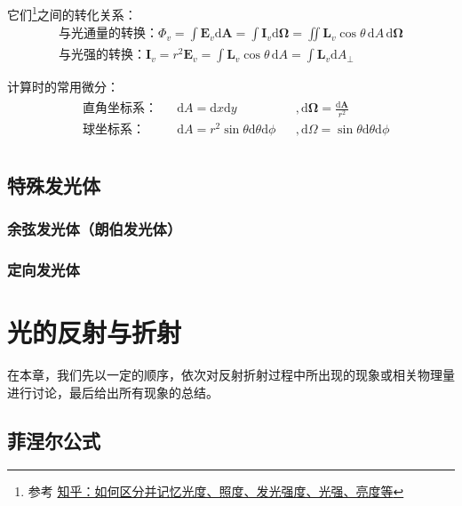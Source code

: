 \documentclass[UTF8]{report}
\theoremstyle{MyLineTheoremStyle} %
\theoremstyle{MyBlockTheoremStyle} %
\theoremstyle{MySubsubsectionStyle} %
\begin{document}
它们\footnote{参考 \href{https://www.zhihu.com/question/53080536/answer/133398317}{知乎：如何区分并记忆光度、照度、发光强度、光强、亮度等}}之间的转化关系：
\begin{gather}
\text{与光通量的转换：} \Phi_v = \int \boldsymbol{E}_v \mathrm{d}\boldsymbol{A} = \int \boldsymbol{I}_v \mathrm{d}\boldsymbol{\Omega} = \iint \boldsymbol{L}_v \cos \theta\, \mathrm{d}A \,\mathrm{d} \boldsymbol{\Omega} \\ 
\text{与光强的转换：} \boldsymbol{I}_v = r^2\boldsymbol{E}_v = \int \boldsymbol{L}_v \cos \theta\, \mathrm{d}A = \int \boldsymbol{L}_v  \mathrm{d}A_{\perp}
\end{gather}

计算时的常用微分：
\begin{gather}
\begin{aligned}
    & \text{直角坐标系：}&& \mathrm{d}A = \mathrm{d}x \mathrm{d}y &&,  \mathrm{d}\boldsymbol{\Omega} = \frac{\mathrm{d}\boldsymbol{A}}{r^2} \\ 
    & \text{球坐标系：}&& \mathrm{d}A = r^2 \sin \theta \mathrm{d}\theta \mathrm{d}\phi &&,\mathrm{d}\Omega = \sin \theta \mathrm{d}\theta \mathrm{d}\phi \\ 
\end{aligned}
\end{gather}

\section{特殊发光体}

\subsection{余弦发光体（朗伯发光体）}

\subsection{定向发光体}

\chapter{光的反射与折射}\thispagestyle{fancy}

在本章，我们先以一定的顺序，依次对反射折射过程中所出现的现象或相关物理量进行讨论，最后给出所有现象的总结。

\section{菲涅尔公式}
\end{document}
